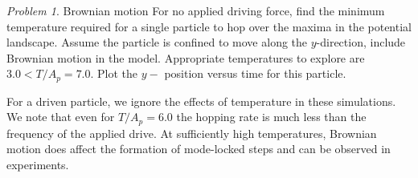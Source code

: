 \documentclass[preprint,showpacs,preprintnumbers,amsmath,amssymb,aps,prb]{revtex4-1}
\theoremstyle{remark}
\newtheorem{problem}{Problem}
\begin{document}
\begin{problem}{Brownian motion}
  For no applied driving force,
  find 
  the minimum temperature required for a single particle
  to hop over the maxima in the potential landscape.
  Assume the particle is confined to
  move along the $y$-direction,
  include Brownian motion 
  in the model.
  Appropriate temperatures to explore
  are $3.0 < T/A_p = 7.0$.
  Plot the $y-$ position versus time
  for this particle.
%  

  For a driven particle,
  we ignore 
  the effects of temperature 
  in these simulations.  
  We note that even for $T/A_p = 6.0$ 
  the hopping rate
  is much less than the
  frequency of the applied drive. %
  At sufficiently high temperatures,
  Brownian motion does affect 
  the formation of mode-locked steps
  and can be observed in experiments.
\end{problem}
\end{document}

